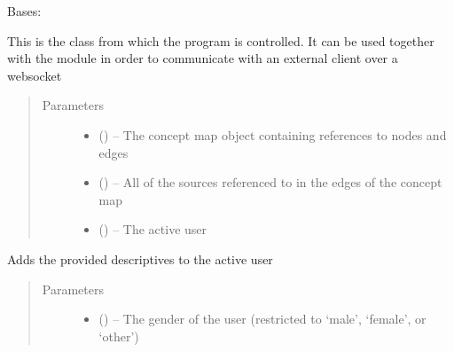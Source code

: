 \documentclass[letterpaper,10pt,english]{sphinxmanual}
\begin{document}
\begin{fulllineitems}
\label{\detokenize{consumer:consumer.Consumer}}
Bases: \href{https://docs.python.org/2/library/functions.html\#object}{}

This is the class from which the program is controlled. It can be used together with the {\hyperref[\detokenize{handler:module-handler}]{}} module in order to communicate with an external client over a websocket
\begin{quote}\begin{description}
\item[{Parameters}] \leavevmode\begin{itemize}
\item {} 
 ({\hyperref[\detokenize{concept_map:concept_map.ConceptMap}]{}}) -- The concept map object containing references to nodes and edges

\item {} 
 (\href{https://docs.python.org/2/library/functions.html\#list}{}\sphinxstyleliteralemphasis{(}\href{https://docs.python.org/2/library/functions.html\#str}{}\sphinxstyleliteralemphasis{)}\sphinxstyleliteralemphasis{}) -- All of the sources referenced to in the edges of the concept map

\item {} 
 ({\hyperref[\detokenize{user:user.User}]{}}) -- The active user

\end{itemize}

\end{description}\end{quote}

\begin{fulllineitems}
\label{\detokenize{consumer:consumer.Consumer.add_descriptives}}
Adds the provided descriptives to the active user
\begin{quote}\begin{description}
\item[{Parameters}] \leavevmode\begin{itemize}
\item {} 
 (\href{https://docs.python.org/2/library/functions.html\#str}{}) -- The gender of the user (restricted to `male', `female', or `other')


\end{itemize}
\end{description}
\end{quote}
\end{fulllineitems}
\end{fulllineitems}
\end{document}
